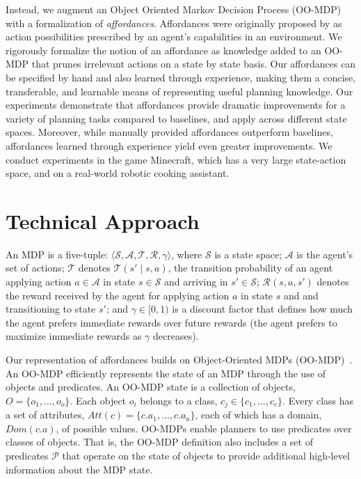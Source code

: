\documentclass[letterpaper]{article}
\begin{document}
Instead, we augment an Object Oriented Markov Decision Process (OO-MDP) with a formalization of {\em
  affordances}. Affordances were originally proposed by \citet{gibson77} as
action possibilities prescribed by an agent's capabilities in an environment.
We rigorously formalize the notion of an affordance as knowledge added
to an OO-MDP that prunes irrelevant actions on a state by state basis.
Our affordances can be specified by hand and also learned through experience,
making them a concise, transferable, and learnable means of
representing useful planning knowledge. Our experiments demonstrate
that affordances provide dramatic improvements for a variety of planning
tasks compared to baselines, and apply across different state spaces.
Moreover, while manually provided affordances outperform baselines, affordances
learned through experience yield even greater improvements. 
We conduct experiments in the game Minecraft, which has a very
large state-action space, and on a real-world robotic cooking assistant.


\section{Technical Approach}
\label{sec:affordances}

An MDP is a five-tuple: $\langle \mathcal{S}, \mathcal{A},
\mathcal{T}, \mathcal{R}, \gamma \rangle$, where $\mathcal{S}$ is a
state space; $\mathcal{A}$ is the agent's set of actions;
$\mathcal{T}$ denotes $\mathcal{T}(s' \mid s,a)$, the transition
probability of an agent applying action $a \in \mathcal{A}$ in state
$s \in \mathcal{S}$ and arriving in $s' \in \mathcal{S}$;
$\mathcal{R}(s,a,s')$ denotes the reward received by the agent for
applying action $a$ in state $s$ and and transitioning to state $s'$;
and $\gamma \in [0, 1)$ is a discount factor that defines how much the
agent prefers immediate rewards over future rewards (the agent
prefers to maximize immediate rewards as $\gamma$ decreases).

Our representation of affordances builds on Object-Oriented MDPs
(OO-MDP)~\citep{diuk08}.  An OO-MDP efficiently represents the state
of an MDP through the use of objects and predicates.  An OO-MDP state
is a collection of objects, $O = \{o_1, \ldots, o_o \}$.  Each object
$o_i$ belongs to a class, $c_j \in \{c_1, \ldots, c_c\}$. Every class
has a set of attributes, $Att(c) = \{c.a_1, \ldots, c.a_a \}$, each of
which has a domain, $Dom(c.a)$, of possible values. OO-MDPs enable
planners to use predicates over classes of objects. That is, the
OO-MDP definition also includes a set of predicates $\mathcal{P}$ that
operate on the state of objects to provide additional high-level
information about the MDP state.
\end{document}
